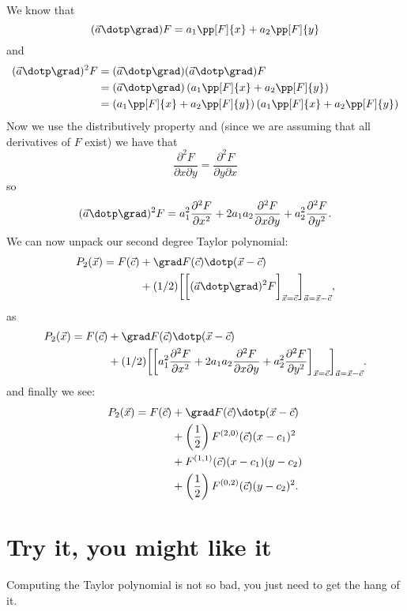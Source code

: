 \documentclass{ximera}
\begin{document}
We know that
\[
(\vec{a}\dotp\grad)F = a_1 \pp[F]{x} + a_2 \pp[F]{y}
\]
and 
\begin{align*}
(\vec{a}\dotp\grad)^2F &=(\vec{a}\dotp\grad)(\vec{a}\dotp\grad)F\\
  &= (\vec{a}\dotp\grad)\left(a_1 \pp[F]{x} + a_2 \pp[F]{y}\right)\\
  &= \left(a_1 \pp[F]{x} + a_2 \pp[F]{y}\right)\left(a_1 \pp[F]{x} + a_2 \pp[F]{y}\right)
\end{align*}
Now we use the distributively property and (since we are assuming that
all derivatives of $F$ exist) we have that
\[
\frac{\partial^2F}{\partial x\partial y}  = \frac{\partial^2F}{\partial y\partial x}
\]
so
\[
(\vec{a}\dotp\grad)^2F = a_1^2\frac{\partial^2F}{\partial x^2} + 2a_1
a_2\frac{\partial^2F}{\partial x\partial y} +
a_2^2\frac{\partial^2F}{\partial y^2}.
\]
We can now unpack our second degree Taylor polynomial:
\begin{align*}
  P_2(\vec{x})= F(\vec{c})
&+ \grad F(\vec{c})\dotp (\vec{x}-\vec{c})\\
&+(1/2)\eval{\eval{(\vec{a}\dotp\grad)^2F}_{\vec{x}=\vec{c}}}_{\vec{a}=\vec{x}-\vec{c}},
\end{align*}
as
\begin{align*}
P_2(\vec{x})=F(\vec{c})
&+ \grad F(\vec{c})\dotp (\vec{x}-\vec{c})\\
&+(1/2)\eval{\eval{a_1^2\frac{\partial^2F}{\partial x^2} + 2a_1 
a_2\frac{\partial^2F}{\partial x\partial y} +
a_2^2\frac{\partial^2F}{\partial y^2}}_{\vec{x}=\vec{c}}}_{\vec{a}=\vec{x}-\vec{c}}.
\end{align*}
and finally we see:
\begin{align*}
P_2(\vec{x})=F(\vec{c})
&+ \grad F(\vec{c})\dotp (\vec{x}-\vec{c})\\
&+\left(\frac{1}{2}\right)F^{(2,0)}(\vec{c}) (x-c_1)^2 \\
&+ F^{(1,1)}(\vec{c})(x-c_1)(y-c_2) \\
&+ \left(\frac{1}{2}\right)F^{(0,2)}(\vec{c})(y-c_2)^2.
\end{align*}


\section{Try it, you might like it}

Computing the Taylor polynomial is not so bad, you just need to get the hang of it. 
\end{document}
